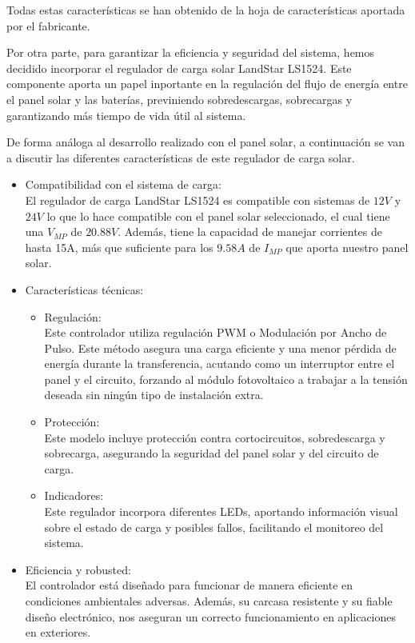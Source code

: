 Todas estas características se han obtenido de la hoja de características aportada por el fabricante.\cite{semperesolutionsPanelSolarMonocristalino}

Por otra parte, para garantizar la eficiencia y seguridad del sistema, hemos decidido incorporar el regulador de carga solar LandStar LS1524. Este componente aporta un papel inportante en la regulación del flujo de energía entre el panel solar y las baterías, previniendo sobredescargas, sobrecargas y garantizando más tiempo de vida útil al sistema.

De forma análoga al desarrollo realizado con el panel solar, a continuación se van a discutir las diferentes características de este regulador de carga solar.

\begin{itemize}
    \item Compatibilidad con el sistema de carga: \\
    El regulador de carga LandStar LS1524 es compatible con sistemas de $12 V$ y $24 V$ lo que lo hace compatible con el panel solar seleccionado, el cual tiene una $V_{MP}$ de $20.88 V$. Además, tiene la capacidad de manejar corrientes de hasta 15A, más que suficiente para los $9.58 A$ de $I_{MP}$ que aporta nuestro panel solar.

    \item  Características técnicas:
    \begin{itemize}
        \item Regulación: \\
        Este controlador utiliza regulación PWM o Modulación por Ancho de Pulso. Este método asegura una carga eficiente y una menor pérdida de energía durante la transferencia, acutando como un interruptor entre el panel y el circuito, forzando al módulo fotovoltaico a trabajar a la tensión deseada sin ningún tipo de instalación extra.
        \item Protección: \\
        Este modelo incluye protección contra cortocircuitos, sobredescarga y sobrecarga, asegurando la seguridad del panel solar y del circuito de carga.
        \item Indicadores: \\
        Este regulador incorpora diferentes LEDs, aportando información visual sobre el estado de carga y posibles fallos, facilitando el monitoreo del sistema.
    \end{itemize}

    \item  Eficiencia y robusted: \\
    El controlador está diseñado para funcionar de manera eficiente en condiciones ambientales adversas. Además, su carcasa resistente y su fiable diseño electrónico, nos aseguran un correcto funcionamiento en aplicaciones en exteriores.


\end{itemize}
